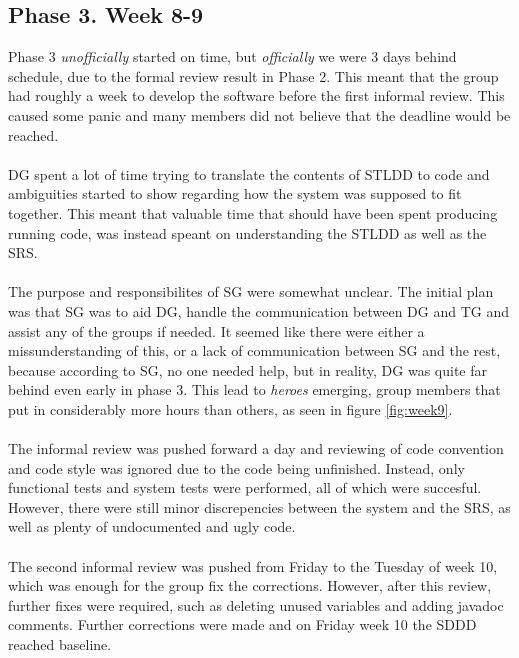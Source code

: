 \documentclass{article}
\begin{document}
    \subsection{Phase 3. Week 8-9 \label{phase3}}
        Phase 3 \emph{unofficially} started on time, but \emph{officially} we were 3 days behind schedule, due to
        the formal review result in Phase 2. This meant that the group had roughly a week to develop the software
        before the first informal review. This caused some panic and many members did not believe that the
        deadline would be reached.
        \\ \\
        DG spent a lot of time trying to translate the contents of STLDD to code
        and ambiguities started to show regarding how the system was supposed to fit together.
        This meant that valuable time that should have been spent producing running code, was
        instead speant on understanding the STLDD as well as the SRS.
        \\ \\
        The purpose and responsibilites of SG were somewhat unclear. The initial plan was that SG
        was to aid DG, handle the communication between DG and TG and assist any of the
        groups if needed. It seemed like there were either a missunderstanding of this, or a lack of
        communication between SG and the rest, because according  to SG, no one needed help, but in
        reality, DG was quite far behind even early in phase 3.
        This lead to \emph{heroes}
        emerging, group members that put in considerably more hours than others, as seen in figure \ref{fig:week9}.
        \\ \\
        The informal review was pushed forward a day and reviewing of code
        convention and code style was ignored due to the code being unfinished. Instead, only
        functional tests and system tests were performed, all of which were succesful. However, there
        were still minor discrepencies between the system and the SRS, as well as plenty of
        undocumented and ugly code. 
        \\ \\
        The second informal review was pushed from Friday to the Tuesday of week 10, which was enough
        for the group fix the corrections. However, after this review, further fixes were required,
        such as deleting unused variables and adding javadoc comments. Further corrections were made and on Friday week 10 the SDDD reached baseline.
        
\end{document}
